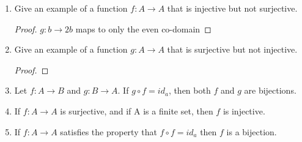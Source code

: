 \documentclass{article}
\begin{document}
\begin{enumerate}
\begin{proof}
    \end{proof}
  \item Give an example of a function $f : A\to A$ that is injective but not surjective.
    \begin{proof}
      $g : b\to 2b$ maps to only the even co-domain
    \end{proof}
  \item Give an example of a function $g : A\to A$ that is surjective but not injective. 
    \begin{proof}

    \end{proof}
  \item Let $f : A\to B$ and $g : B\to A$. If $g \circ f = id_{a}$, then both $f$ and $g$ are bijections.
  \item If $f : A\to A$ is surjective, and if A is a finite set, then $f$ is injective.
  \item If $f : A\to A$ satisfies the property that $f \circ f = id_{a}$ then $f$ is a bijection.
  \end{enumerate}
\end{document}

